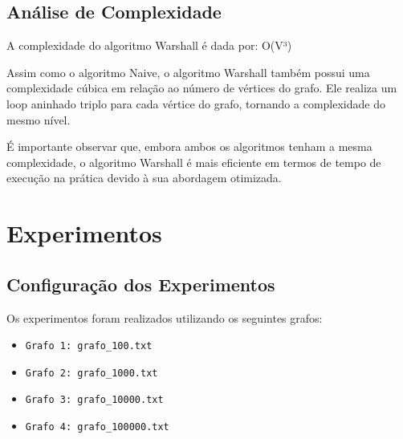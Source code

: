 \documentclass{article}
\begin{document}
\subsection{Análise de Complexidade}

A complexidade do algoritmo Warshall é dada por: O(V³)
\vspace{10pt} %
\par Assim como o algoritmo Naive, o algoritmo Warshall também possui uma complexidade cúbica em relação ao número de vértices do grafo. Ele realiza um loop aninhado triplo para cada vértice do grafo, tornando a complexidade do mesmo nível.
\vspace{10pt} %
\par É importante observar que, embora ambos os algoritmos tenham a mesma complexidade, o algoritmo Warshall é mais eficiente em termos de tempo de execução na prática devido à sua abordagem otimizada.

\section{Experimentos}


\subsection{Configuração dos Experimentos}

Os experimentos foram realizados utilizando os seguintes grafos:

\begin{itemize}
\item \begin{verbatim}
Grafo 1: grafo_100.txt
\end{verbatim}

\item \begin{verbatim}
Grafo 2: grafo_1000.txt
\end{verbatim}

\item \begin{verbatim}
Grafo 3: grafo_10000.txt
\end{verbatim}

\item \begin{verbatim}
Grafo 4: grafo_100000.txt
\end{verbatim}
\end{itemize}
\end{document}
